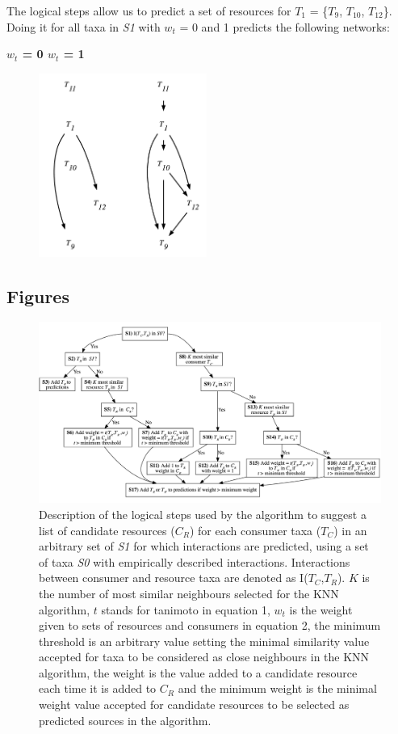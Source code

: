 \documentclass[letterpaper]{article}
\begin{document}
The logical steps allow us to predict a set of resources for $T_1$ = \{$T_9$, $T_{10}$, $T_{12}$\}. Doing it for all taxa in \textit{S1} with $w_t$ = 0 and 1 predicts the following networks:
\bigskip

\centerline{\textbf{$w_t$ = 0 \quad \quad \quad \quad \quad $w_t$ = 1} \quad}
    \begin{figure}[h!]
    \centering\includegraphics[height = 6cm]{example.pdf}
    \end{figure}

\newpage
\subsection{Figures}
    \begin{figure}[h]
      \centering\includegraphics[width=\textwidth]{Decision_Diagram.png}
      \caption{Description of the logical steps used by the algorithm to suggest a list of candidate resources ($C_R$) for each consumer taxa ($T_C$) in an arbitrary set of \textit{S1} for which interactions are predicted, using a set of taxa \textit{S0} with empirically described interactions. Interactions between consumer and resource taxa are denoted as I($T_C$,$T_R$). $K$ is the number of most similar neighbours selected for the KNN algorithm, $t$ stands for tanimoto in equation 1, $w_t$ is the weight given to sets of resources and consumers in equation 2, the minimum threshold is an arbitrary value setting the minimal similarity value accepted for taxa to be considered as close neighbours in the KNN algorithm, the weight is the value added to a candidate resource each time it is added to $C_R$ and the minimum weight is the minimal weight value accepted for candidate resources to be selected as predicted sources in the algorithm.}
      \label{fig:decision_diag}
    \end{figure}
\end{document}
